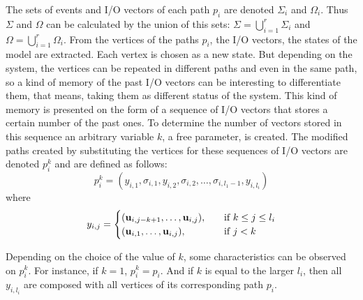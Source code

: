 The sets of events and I\slash O vectors of each path $p_i$ are denoted $\Sigma_i$
and $\Omega_i$. Thus $\Sigma$ and $\Omega$ can be calculated by the union of
this sets: $\Sigma=\bigcup_{i=1}^r\Sigma_i$ and
$\Omega=\bigcup_{i=1}^r\Omega_i$.
From the vertices of the paths $p_i$, the I\slash O vectors, the states of the model are extracted.
Each vertex is chosen as a new state. But depending on the system, the vertices
can be repeated in different paths and even in the same path, so a kind of
memory of the past I\slash O vectors can be interesting to differentiate them,
that means, taking them as different status of the system. This kind of memory
is presented on the form of a sequence of I\slash O vectors that stores a
certain number of the past ones. To determine the number of vectors stored in this sequence an
arbitrary variable $k$, a free parameter, is created. 
The modified paths created by substituting the vertices for these sequences of
I\slash O vectors are
denoted $p_i^k$ and are defined as follows:
\begin{equation}
  \label{eq:modifiedPath}
 p_i^k= (y_{i,1},\sigma_{i,1},y_{i,2},\sigma_{i,2},\dots,\sigma_{i,l_1-1},y_{i,l_i}) 
\end{equation}
where 
\begin{equation}
  \label{eq:modifiedPathb}
y_{i,j}=\begin{cases}
    (\mathbf{u}_{i,j-k+1},\dots,\mathbf{u}_{i,j}),& \quad \text{if } k\leq j\leq l_i\\
    (\mathbf{u}_{i,1},\dots,\mathbf{u}_{i,j}),  & \quad \text{if } j<k
  \end{cases}
\end{equation}

\begin{observation}
Depending on the choice of the value of $k$, some characteristics can be
observed on $p_i^k$. For instance, if $k=1$, $p_i^k=p_i$. And if $k$ is equal to
the larger $l_i$, then all $y_{i,l_i}$ are composed with all vertices of its
corresponding path $p_i$.
\end{observation}

